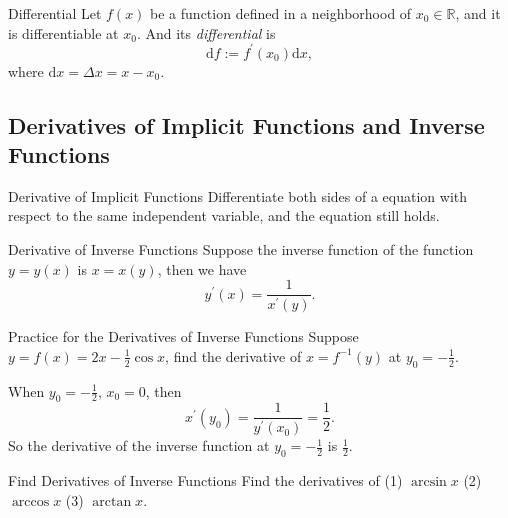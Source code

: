 \begin{definition}{Differential}{}
  Let $f(x)$ be a function defined in a neighborhood of $x_0 \in \mathbb{R}$,
  and it is differentiable at $x_0$.
  And its \emph{differential} is
  \begin{equation}
    \mathrm{d} f := f^{\prime}(x_0) \mathrm{d} x,
  \end{equation}
  where $\mathrm{d} x = \Delta x = x - x_0$.
\end{definition}

\subsection{Derivatives of Implicit Functions and Inverse Functions}

\begin{proposition}{Derivative of Implicit Functions}{}
  Differentiate both sides of a equation with respect to the same independent variable,
  and the equation still holds.
\end{proposition}

\begin{proposition}{Derivative of Inverse Functions}{}
  Suppose the inverse function of the function $y = y(x)$ is $x = x(y)$,
  then we have
  \begin{equation}
    y^{\prime}(x) = \frac{1}{x^{\prime}(y)}.
  \end{equation}
\end{proposition}

\begin{example}{Practice for the Derivatives of Inverse Functions}{}
  Suppose $y = f(x) = 2x - \frac{1}{2} \cos x$,
  find the derivative of $x = f^{-1}(y)$ at $y_0 = -\frac{1}{2}$.
\end{example}

\begin{solution}
  When $y_0 = - \frac{1}{2}$, $x_0 = 0$, then
  \begin{equation}
    x^{\prime}(y_0) = \frac{1}{y^{\prime}(x_0)} = \frac{1}{2}.
  \end{equation}
  So the derivative of the inverse function at $y_0 = - \frac{1}{2}$ is $\frac{1}{2}$.
\end{solution}

\begin{example}{Find Derivatives of Inverse Functions}{}
  Find the derivatives of
  (1) $\arcsin x$ (2) $\arccos x$ (3) $\arctan x$.
\end{example}

